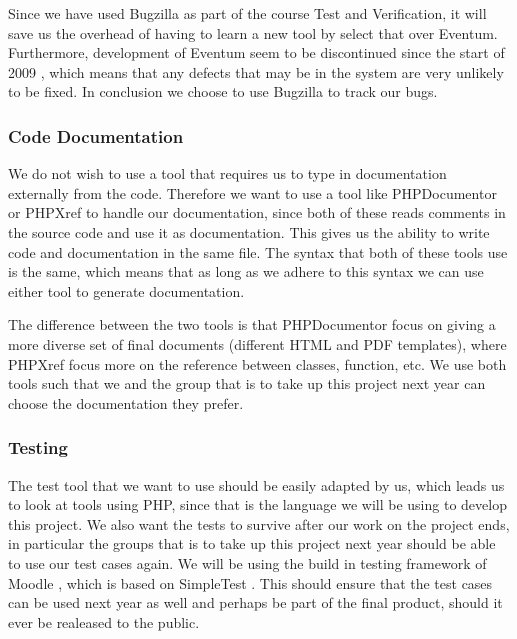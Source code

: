 Since we have used Bugzilla as part of the course Test and Verification, it will save us the overhead of having to learn a new tool by select that over Eventum.
Furthermore, development of Eventum seem to be discontinued since the start of 2009 \cite{eventumDiscont}, which means that any defects that may be in the system are very unlikely to be fixed.
In conclusion we choose to use Bugzilla to track our bugs.

\subsubsection{Code Documentation}
We do not wish to use a tool that requires us to type in documentation externally from the code.
Therefore we want to use a tool like PHPDocumentor \cite{phpdocumentor} or PHPXref \cite{phpxref} to handle our documentation, since both of these reads comments in the source code and use it as documentation.
This gives us the ability to write code and documentation in the same file.
The syntax that both of these tools use is the same, which means that as long as we adhere to this syntax we can use either tool to generate documentation.

The difference between the two tools is that PHPDocumentor focus on giving a more diverse set of final documents (different HTML and PDF templates), where PHPXref focus more on the reference between classes, function, etc.
We use both tools such that we and the group that is to take up this project next year can choose the documentation they prefer.


\subsubsection{Testing}
The test tool that we want to use should be easily adapted by us, which leads us to look at tools using PHP, since that is the language we will be using to develop this project.
We also want the tests to survive after our work on the project ends, in particular the groups that is to take up this project next year should be able to use our test cases again.
We will be using the build in testing framework of Moodle \cite{moodletest}, which is based on SimpleTest \cite{simpletest}.
This should ensure that the test cases can be used next year as well and perhaps be part of the final product, should it ever be realeased to the public.














